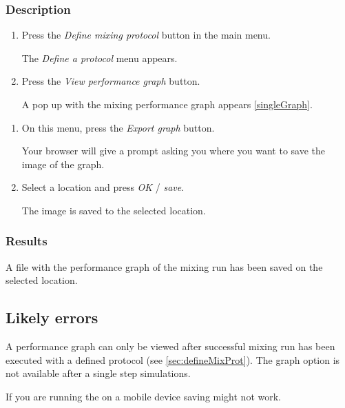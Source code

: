 \subsubsection{Description}
\begin{enumerate}
	\item  Press the \emph{Define mixing protocol} button in the main menu. 
		\begin{itemize}
            The \emph{Define a protocol} menu appears.
		\end{itemize}
	\item Press the \emph{View performance graph} button.
		\begin{itemize}
            A pop up with the mixing performance graph appears \ref{singleGraph}.
		\end{itemize}
\end{enumerate}
\begin{enumerate}

    \item On this menu, press the \emph{Export graph} button.
		\begin{itemize}
             Your browser will give a prompt asking you where you want to save the image of the graph.
		\end{itemize}
    \item  Select a location and press \emph{OK} / \emph{save}.
		\begin{itemize}
            The image is saved to the selected location.
		\end{itemize}
\end{enumerate}

\subsubsection{Results}
A file with the performance graph of the mixing run has been saved on the selected location.

\subsection{Likely errors}
A performance graph can only be viewed after successful mixing run has been executed with a defined protocol (see \ref{sec:defineMixProt}). The graph option is not available after a single step simulations.

If you are running the \applicationname on a mobile device saving might not work.

